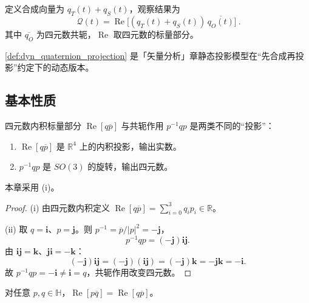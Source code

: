 \begin{definition}[合成—投影观察结果]\label{def:dyn_quaternion_projection}
定义合成向量为 $q_T(t)+q_S(t)$，观察结果为
\[
\boxed{\ \mathcal Q(t)=\operatorname{Re}\!\big[(q_T(t)+q_S(t))\,\overline{q_O(t)}\big]\ }.
\]
其中 $\overline{q_O}$ 为四元数共轭，$\operatorname{Re}$ 取四元数的标量部分。
\end{definition}

\begin{remark}\label{rem:dyn_quaternion_static_relation}
\cref{def:dyn_quaternion_projection} 是「矢量分析」章静态投影模型在“先合成再投影”约定下的动态版本。
\end{remark}

\subsection{基本性质}

\begin{proposition}[标量投影与共轭投影的区别]\label{prop:dyn_quaternion_projection_types}
四元数内积标量部分 $\operatorname{Re}[q\overline{p}]$ 与共轭作用 $p^{-1}qp$ 是两类不同的“投影”：
\begin{enumerate}[label=(\roman*)]
    \item $\operatorname{Re}[q\overline{p}]$ 是 $\mathbb R^4$ 上的内积投影，输出实数。
    \item $p^{-1}qp$ 是 $SO(3)$ 的旋转，输出四元数。
\end{enumerate}
本章采用 (i)。
\end{proposition}

\begin{proof}
(i) 由四元数内积定义 $\operatorname{Re}[q\overline p]=\sum_{i=0}^3 q_i p_i\in\mathbb R$。

(ii) 取 $q=\mathbf i$、$p=\mathbf j$。则 $p^{-1}=\overline p/|p|^2=-\mathbf j$，
\[
p^{-1}qp=(-\mathbf j)\mathbf i\mathbf j.
\]
由 $\mathbf i\mathbf j=\mathbf k$、$\mathbf j\mathbf i=-\mathbf k$：
\[
(-\mathbf j)\mathbf i\mathbf j=(-\mathbf j)(\mathbf i\mathbf j)=(-\mathbf j)\mathbf k=-\mathbf j\mathbf k=-\mathbf i.
\]
故 $p^{-1}qp=-\mathbf i\neq\mathbf i=q$，共轭作用改变四元数。
\end{proof}

\begin{lemma}[四元数内积的对称性]\label{lem:dyn_quaternion_inner_symmetry}
对任意 $p,q\in\mathbb H$，$\operatorname{Re}[p\overline q]=\operatorname{Re}[q\overline p]$。
\end{lemma}

